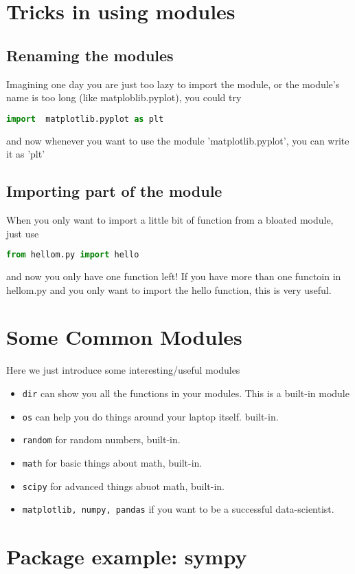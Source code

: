 \documentclass[12pt]{article}
\begin{document}
\section{Tricks in using modules}
\subsection{Renaming the modules}
Imagining one day you are just too lazy to import the module, or the module's name is too long (like matploblib.pyplot), you could try
\begin{lstlisting}[language=python,caption=alias]
	import  matplotlib.pyplot as plt
\end{lstlisting}

and now whenever you want to use the module 'matplotlib.pyplot', you can write it as 'plt'
\subsection{Importing part of the module}
When you only want to import a little bit of function from a bloated module, just use
\begin{lstlisting}[language=python,caption=import part]
	from hellom.py import hello
\end{lstlisting}
and now you only have one function left! If you have more than one functoin in hellom.py and you only want to import the hello function, this is very useful.
\section{Some Common Modules}
Here we just introduce some interesting/useful modules
\begin{itemize}
	\item \texttt{dir} can show you all the functions in your modules. This is a built-in module
	\item \texttt{os} can help you do things around your laptop itself. built-in.
	\item \texttt{random} for random numbers, built-in.
	\item \texttt{math} for basic things about math, built-in.
	\item \texttt{scipy} for advanced things abuot math, built-in.
	\item \texttt{matplotlib, numpy, pandas} if you want to be a successful data-scientist.
\end{itemize}
\section{Package example: sympy}
\end{document}
